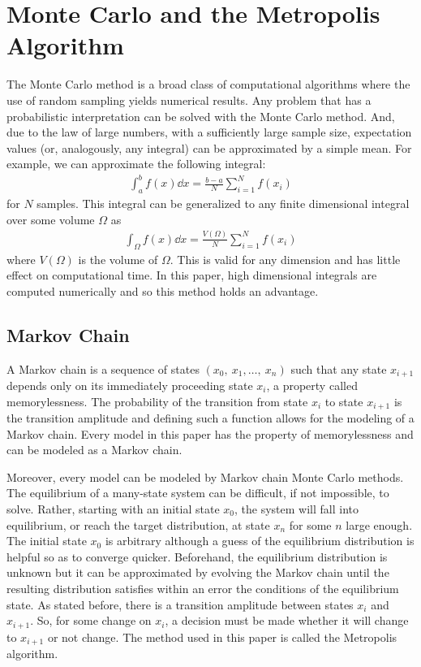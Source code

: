 \documentclass[11pt]{article}
\begin{document}
\section{Monte Carlo and the Metropolis Algorithm}
The Monte Carlo method is a broad class of computational algorithms where the use of random sampling yields numerical results. Any problem that has a probabilistic interpretation can be solved with the Monte Carlo method. And, due to the law of large numbers, with a sufficiently large sample size, expectation values (or, analogously, any integral) can be approximated by a simple mean. For example, we can approximate the following integral:
\begin{align}
	\int_a^bf(x)\dd{x}=\frac{b-a}{N}\sum_{i=1}^Nf(x_i)
\end{align}
for $N$ samples. This integral can be generalized to any finite dimensional integral over some volume $\Omega$ as
\begin{align}
	\int_\Omega f(x)\dd{x}=\frac{V(\Omega)}{N}\sum_{i=1}^Nf(x_i)
	\label{eq:MCIntGen}
\end{align} where $V(\Omega)$ is the volume of $\Omega$. This is valid for any dimension and has little effect on computational time. In this paper, high dimensional integrals are computed numerically and so this method holds an advantage.

\subsection{Markov Chain}
A Markov chain is a sequence of states $(x_0,\ x_1,\ldots,\ x_n)$ such that any state $x_{i+1}$ depends only on its immediately proceeding state $x_i$, a property called memorylessness. The probability of the transition from state $x_i$ to state $x_{i+1}$ is the transition amplitude and defining such a function allows for the modeling of a Markov chain. Every model in this paper has the property of memorylessness and can be modeled as a Markov chain.

Moreover, every model can be modeled by Markov chain Monte Carlo methods. The equilibrium of a many-state system can be difficult, if not impossible, to solve. Rather, starting with an initial state $x_0$, the system will fall into equilibrium, or reach the target distribution, at state $x_n$ for some $n$ large enough. The initial state $x_0$ is arbitrary although a guess of the equilibrium distribution is helpful so as to converge quicker. Beforehand, the equilibrium distribution is unknown but it can be approximated by evolving the Markov chain until the resulting distribution satisfies within an error the conditions of the equilibrium state. As stated before, there is a transition amplitude between states $x_i$ and $x_{i+1}$. So, for some change on $x_i$, a decision must be made whether it will change to $x_{i+1}$ or not change. The method used in this paper is called the Metropolis algorithm.
\end{document}
